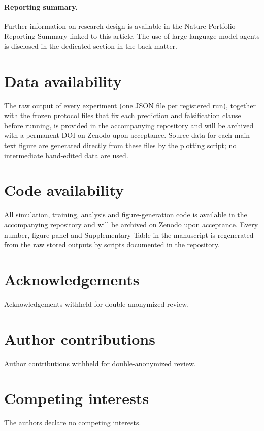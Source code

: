 \documentclass[11pt]{article}
\begin{document}
\paragraph{Reporting summary.}
Further information on research design is available in the Nature
Portfolio Reporting Summary linked to this article. The use of
large-language-model agents is disclosed in the dedicated section in
the back matter.

\normalsize

\section*{Data availability}
\small
The raw output of every experiment (one JSON file per registered run),
together with the frozen protocol files that fix each prediction and
falsification clause before running, is provided in the accompanying
repository and will be archived with a permanent DOI on Zenodo upon
acceptance. Source data for
each main-text figure are generated directly from these files by the
plotting script; no intermediate hand-edited data are used.
\normalsize

\section*{Code availability}
\small
All simulation, training, analysis and figure-generation code is
available in the accompanying repository and will be archived on
Zenodo upon acceptance. Every number, figure panel and Supplementary
Table in the manuscript is regenerated from the raw stored outputs by
scripts documented in the repository.
\normalsize

\section*{Acknowledgements}
\small
Acknowledgements withheld for double-anonymized review.
\normalsize

\section*{Author contributions}
\small
Author contributions withheld for double-anonymized review.
\normalsize

\section*{Competing interests}
\small
The authors declare no competing interests.
\normalsize
\end{document}
